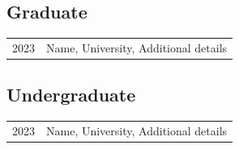 

\subsection*{Graduate}
\begin{longtable}[l]{@{}p{} p{}@{}}

    2023 & Name, University, Additional details \\

\end{longtable}

\subsection*{Undergraduate}
\begin{longtable}[l]{@{}p{} p{}@{}}

    2023 & Name, University, Additional details \\

\end{longtable}